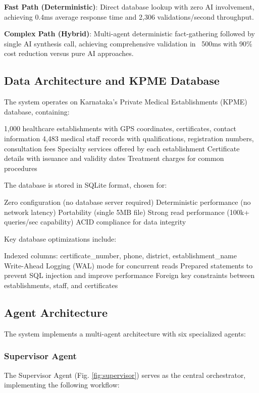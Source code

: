 \documentclass[conference]{IEEEtran}
\begin{document}
\textbf{Fast Path (Deterministic)}: Direct database lookup with zero AI involvement, achieving 0.4ms average response time and 2,306 validations/second throughput.

\textbf{Complex Path (Hybrid)}: Multi-agent deterministic fact-gathering followed by single AI synthesis call, achieving comprehensive validation in ~500ms with 90\% cost reduction versus pure AI approaches.

\subsection{Data Architecture and KPME Database}

The system operates on Karnataka's Private Medical Establishments (KPME) database, containing:

1,000 healthcare establishments with GPS coordinates, certificates, contact information
4,483 medical staff records with qualifications, registration numbers, consultation fees
Specialty services offered by each establishment
Certificate details with issuance and validity dates
Treatment charges for common procedures

The database is stored in SQLite format, chosen for:

Zero configuration (no database server required)
Deterministic performance (no network latency)
Portability (single 5MB file)
Strong read performance (100k+ queries/sec capability)
ACID compliance for data integrity

Key database optimizations include:

Indexed columns: certificate\_number, phone, district, establishment\_name
Write-Ahead Logging (WAL) mode for concurrent reads
Prepared statements to prevent SQL injection and improve performance
Foreign key constraints between establishments, staff, and certificates

\subsection{Agent Architecture}

The system implements a multi-agent architecture with six specialized agents:

\subsubsection{Supervisor Agent}

The Supervisor Agent (Fig. \ref{fig:supervisor}) serves as the central orchestrator, implementing the following workflow:
\end{document}
